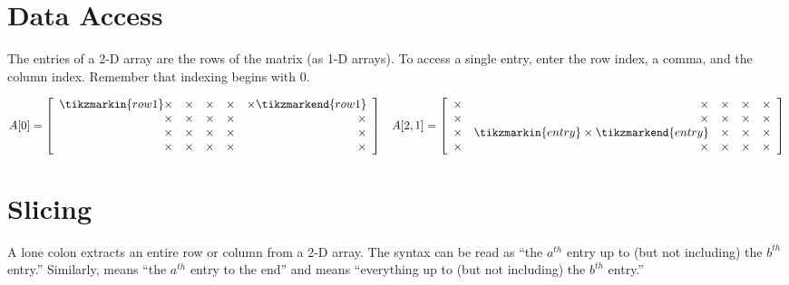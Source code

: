 \label{appendix:numpy-visual-guide}

\section*{Data Access} %

The entries of a 2-D array are the rows of the matrix (as 1-D arrays).
To access a single entry, enter the row index, a comma, and the column index.
Remember that indexing begins with $0$.

\begin{align*}
A[0] = \left[\begin{array}{rrrrr}
\tikzmarkin{row1}\times & \times & \times & \times & \times\tikzmarkend{row1}\\
\times & \times & \times & \times & \times\\
\times & \times & \times & \times & \times\\
\times & \times & \times & \times & \times\\
\end{array}\right]
&&
A[2,1] = \left[\begin{array}{rrrrr}
\times & \times & \times & \times & \times\\
\times & \times & \times & \times & \times\\
\times & \tikzmarkin{entry} \times \tikzmarkend{entry} & \times & \times & \times\\
\times & \times & \times & \times & \times
\end{array}\right]
\end{align*}

\section*{Slicing} %

A lone colon extracts an entire row or column from a 2-D array.
The syntax \li{[a:b]} can be read as ``the $a^{th}$ entry up to (but not including) the $b^{th}$ entry.''
Similarly, \li{[a:]} means ``the $a^{th}$ entry to the end'' and \li{[:b]} means ``everything up to (but not including) the $b^{th}$ entry.''

